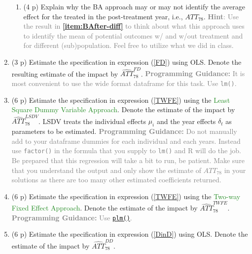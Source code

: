 \documentclass{article}
\begin{document}
\begin{enumerate}[label=\textbf{Q\arabic{enumi}}.,ref=Q\arabic{enumi}, wide=0pt, itemsep=0em, topsep=5pt, labelindent=0pt]
\begin{enumerate}
\item (4 p) Explain why the BA approach may or may not identify the average effect for the treated in the post-treatment year, i.e., ${ATT}_{78}$. \textcolor{gray}{\textbf{Hint}: Use the result in \textbf{\ref{item:BAfter-diff}} to think about what this approach uses to identify the mean of potential outcomes w/ and w/out treatment and for different (sub)population. Feel free to utilize what we did in class.}
\end{enumerate}

\item (3 p) Estimate the specification in expression (\ref{FD}) using OLS. Denote the resulting estimate of the impact by $\widehat{ATT}_{78}^{FD}$. \textcolor{gray}{\textbf{Programming Guidance:} It is most convenient to use the wide format dataframe for this task. Use \texttt{lm()}.}\label{item:fd}

\item (6 p) Estimate the specification in expression (\ref{TWFE}) using the \textcolor{ForestGreen}{Least Square Dummy Variable Approach}. Denote the estimate of the impact by $\widehat{ATT}_{78}^{LSDV}$. LSDV treats the individual effects $\mu_i$ and the year effects $\delta_t$ as parameters to be estimated. \textcolor{Gray}{\textbf{Programming Guidance:} Do not manually add to your dataframe dummies for each individual and each years. Instead use \texttt{factor()} in the formula that you supply to \texttt{lm()} and R will do the job. Be prepared that this regression will take a bit to run, be patient. Make sure that you understand the output and only show the estimate of ${ATT}_{78}$ in your solutions as there are too many other estimated coefficients returned.}\label{item:lsdv}

\item (6 p) Estimate the specification in expression (\ref{TWFE}) using the \textcolor{ForestGreen}{Two-way Fixed Effect Approach}. Denote the estimate of the impact by $\widehat{ATT}_{78}^{TWFE}$. \textcolor{Gray}{\textbf{Programming Guidance:} Use \href{https://www.rdocumentation.org/packages/plm/versions/2.6-3/topics/plm}{\texttt{plm()}}.}\label{item:twfe}

\item (6 p) Estimate the specification in expression (\ref{DinD}) using OLS. Denote the estimate of the impact by $\widehat{ATT}_{78}^{DD}$.\label{item:dd} 


\end{enumerate}
\end{document}
